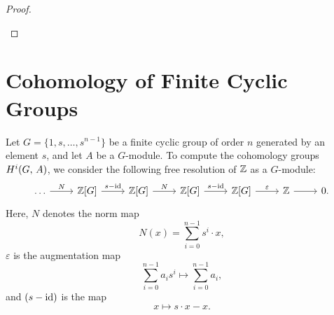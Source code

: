 \documentclass[a4paper, oneside]{memoir}
\begin{document}
\begin{proof}
\begin{center}
\label{fig:SpSeq}
	\end{center}
\end{proof}

\section{Cohomology of Finite Cyclic Groups}
Let $G=\{1,s,\ldots,s^{n-1}\}$ be a finite cyclic group of order $n$ generated by an element $s$, and let $A$ be a $G$-module. To compute the cohomology groups $H^{i}( G, \, A )$, we consider the following free resolution of $\mathbb{Z}$ as a $G$-module:
\begin{equation}\label{eq:CycRes}
	\begin{tikzcd}
		\dots \arrow[r, "N"] & \ZG{G} \arrow[r, "s-\id"] & \ZG{G} \arrow[r, "N"] & \ZG{G} \arrow[r, "s-\id"] & \ZG{G} \arrow[r, "\varepsilon"] & \Z \arrow[r] & 0.
	\end{tikzcd}
\end{equation}
Here, $N$ denotes the norm map
\[
	N(x)=\sum_{i=0}^{n-1} s^i\cdot x,
\]
$\varepsilon$ is the augmentation map
\[
	\sum_{i=0}^{n-1} a_i s^i \mapsto \sum_{i=0}^{n-1} a_i,
\]
and $(s-\operatorname{id})$ is the map \[x\mapsto s\cdot x-x.\]
\end{document}
